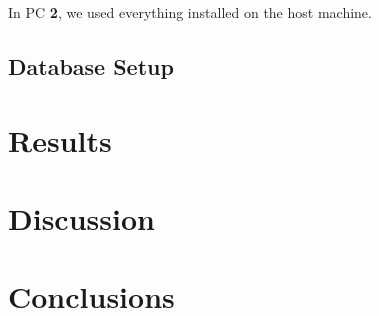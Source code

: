 In PC \textbf{2}, we used everything installed on the host machine.

\subsection{Database Setup}
\label{sec:database-setup}

\section{Results}
\label{sec:results}

\section{Discussion}
\label{sec:discussion}

\section{Conclusions}
\label{sec:conclusions}
